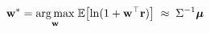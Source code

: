 \documentclass[preview]{standalone}
\begin{document}
\begin{align*}
\special{dvisvgm:raw <g id='unique000'>}\mathbf{w}^* = \underset{\mathbf{w}}{\arg\max}\;\mathbb{E}\!\left[\ln(1 + \mathbf{w}^\top \mathbf{r})\right]\;\approx\; \Sigma^{-1}\boldsymbol{\mu}\special{dvisvgm:raw </g>}
\end{align*}
\end{document}
